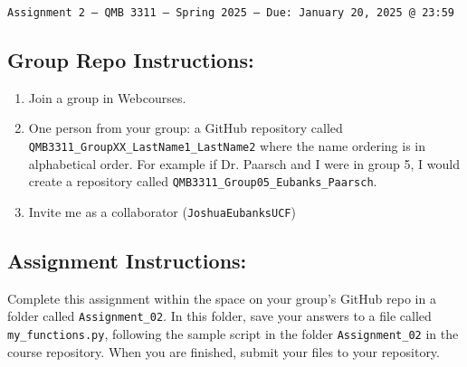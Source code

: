 \documentclass[11pt]{exam}
\begin{document}
\texttt{Assignment 2 --- QMB 3311 ---  Spring 2025  --- Due: January 20, 2025 @ 23:59}


\subsection*{Group Repo Instructions:}

\begin{enumerate}
    \item Join a group in Webcourses.
    \item One person from your group: a GitHub repository called \texttt{QMB3311\_GroupXX\_LastName1\_LastName2} where the name ordering is in alphabetical order. For example if Dr. Paarsch and I were in group 5, I would create a repository called \texttt{QMB3311\_Group05\_Eubanks\_Paarsch}.
    \item Invite me as a collaborator (\texttt{JoshuaEubanksUCF})
\end{enumerate}

\subsection*{Assignment Instructions:}

Complete this assignment within the space on your group's GitHub repo in a folder called \texttt{Assignment\_02}. In this folder, save your answers to a file called \texttt{my\_functions.py}, following the sample script in the folder \texttt{Assignment\_02} in the course repository. When you are finished, submit your files to your repository.
\end{document}
